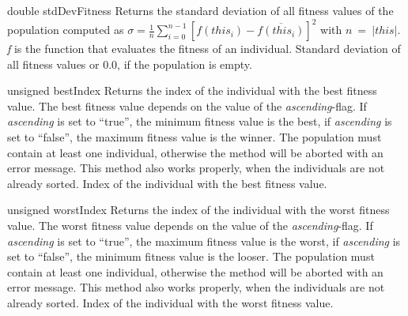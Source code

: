 \clearpage

\setConstInstance
\printEmptyMethodReturn
{double}
{stdDevFitness}
{Returns the standard deviation of all fitness values of the population
 computed as $\sigma = \frac{1}{n}\sum_{i=0}^{n-1}{[f(this_i) - 
 \overline{f(this_i)}]}^2$ with $n\ =\ |this|$. {\em f} is the function 
 that evaluates
 the fitness of an individual.}
{Standard deviation of all fitness values or $0.0$, if the population
 is empty.}

\vspace*{4ex}

\setConstInstance
\printEmptyMethodReturn
{unsigned}
{bestIndex}
{Returns the index of the individual with the best fitness value.
 The best fitness value depends on the value of the {\em ascending}-flag.
 If {\em ascending} is set to ``true'', the minimum fitness value
 is the best, if {\em ascending} is set to ``false'', the maximum
 fitness value is the winner. The population must contain at least
 one individual, otherwise the method will be aborted with an error
 message. This method also works properly, when the individuals are
 not already sorted.}
{Index of the individual with the best fitness value.}

\vspace*{4ex}

\setConstInstance
\printEmptyMethodReturn
{unsigned}
{worstIndex}
{Returns the index of the individual with the worst fitness value.
 The worst fitness value depends on the value of the {\em ascending}-flag.
 If {\em ascending} is set to ``true'', the maximum fitness value
 is the worst, if {\em ascending} is set to ``false'', the minimum
 fitness value is the looser. The population must contain at least
 one individual, otherwise the method will be aborted with an error
 message. This method also works properly, when the individuals are
 not already sorted.}
{Index of the individual with the worst fitness value.}

\clearpage

